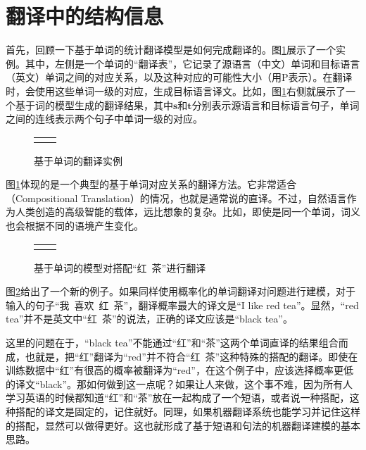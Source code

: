 \section{翻译中的结构信息}

\parinterval 首先，回顾一下基于单词的统计翻译模型是如何完成翻译的。图\ref{fig:4-1}展示了一个实例。其中，左侧是一个单词的``翻译表''，它记录了源语言（中文）单词和目标语言（英文）单词之间的对应关系，以及这种对应的可能性大小（用P表示）。在翻译时，会使用这些单词一级的对应，生成目标语言译文。比如，图\ref{fig:4-1}右侧就展示了一个基于词的模型生成的翻译结果，其中$\mathbf{s}$和$\mathbf{t}$分别表示源语言和目标语言句子，单词之间的连线表示两个句子中单词一级的对应。

\begin{figure}[htp]
\centering
\begin{tabular}{l r}
\subfigure{} & \subfigure{} \\
\end{tabular}
\caption{基于单词的翻译实例}
\label{fig:4-1}
\end{figure}

\parinterval 图\ref{fig:4-1}体现的是一个典型的基于单词对应关系的翻译方法。它非常适合{\small{}}（Compositional Translation）的情况，也就是通常说的直译。不过，自然语言作为人类创造的高级智能的载体，远比想象的复杂。比如，即使是同一个单词，词义也会根据不同的语境产生变化。

\begin{figure}[htp]
\centering
\begin{tabular}{l r}
\subfigure{} & \subfigure{}
\end{tabular}
\caption{基于单词的模型对搭配``红\ 茶''进行翻译}
\label{fig:4-2}
\end{figure}


\parinterval 图\ref{fig:4-2}给出了一个新的例子。如果同样使用概率化的单词翻译对问题进行建模，对于输入的句子``我\ 喜欢\ 红\ 茶''，翻译概率最大的译文是``I like red tea''。显然，``red tea''并不是英文中``红\ 茶''的说法，正确的译文应该是``black tea''。

\parinterval 这里的问题在于，``black tea''不能通过``红''和``茶''这两个单词直译的结果组合而成，也就是，把``红''翻译为``red''并不符合``红\ 茶''这种特殊的搭配的翻译。即使在训练数据中``红''有很高的概率被翻译为``red''，在这个例子中，应该选择概率更低的译文``black''。那如何做到这一点呢？如果让人来做，这个事不难，因为所有人学习英语的时候都知道``红''和``茶''放在一起构成了一个短语，或者说一种搭配，这种搭配的译文是固定的，记住就好。同理，如果机器翻译系统也能学习并记住这样的搭配，显然可以做得更好。这也就形成了基于短语和句法的机器翻译建模的基本思路。

